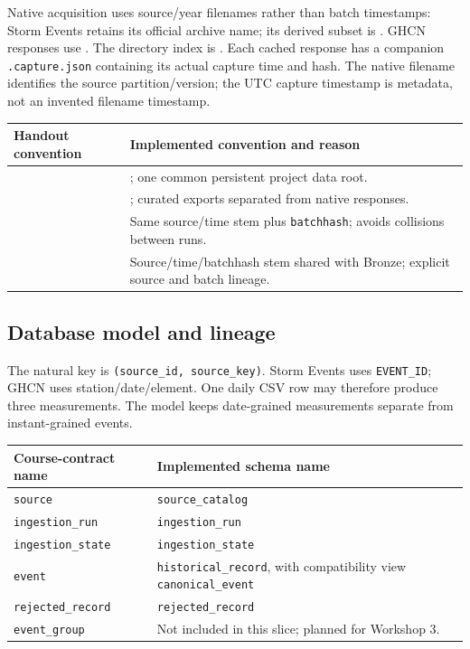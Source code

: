 \documentclass[10pt]{article}
\begin{document}
Native acquisition uses source/year filenames rather than batch timestamps:
Storm Events retains its official 
archive name; its derived subset is . GHCN responses
use . The directory index is
. Each cached response has a companion
\texttt{.capture.json} containing its actual capture time and hash. The native
filename identifies the source partition/version; the UTC capture timestamp is
metadata, not an invented filename timestamp.

\begin{tabularx}{\textwidth}{@{}YY@{}}
\toprule Handout convention & Implemented convention and reason\\\midrule
{} & ; one common persistent project data root.\\
 & ; curated exports separated from native responses.\\
 & Same source/time stem plus \texttt{batchhash}; avoids collisions between runs.\\
 & Source/time/batchhash stem shared with Bronze; explicit source and batch lineage.\\
\bottomrule\end{tabularx}

\subsection{Database model and lineage}
The natural key is \texttt{(source\_id, source\_key)}. Storm Events uses
\texttt{EVENT\_ID}; GHCN uses station/date/element. One daily CSV row may therefore
produce three measurements. The model keeps date-grained measurements separate
from instant-grained events.

\begin{tabularx}{\textwidth}{@{}L{4.6cm}Y@{}}
\toprule Course-contract name & Implemented schema name\\\midrule
\texttt{source} & \texttt{source\_catalog}\\
\texttt{ingestion\_run} & \texttt{ingestion\_run}\\
\texttt{ingestion\_state} & \texttt{ingestion\_state}\\
\texttt{event} & \texttt{historical\_record}, with compatibility view \texttt{canonical\_event}\\
\texttt{rejected\_record} & \texttt{rejected\_record}\\
\texttt{event\_group} & Not included in this slice; planned for Workshop 3.\\
\bottomrule\end{tabularx}
\end{document}
